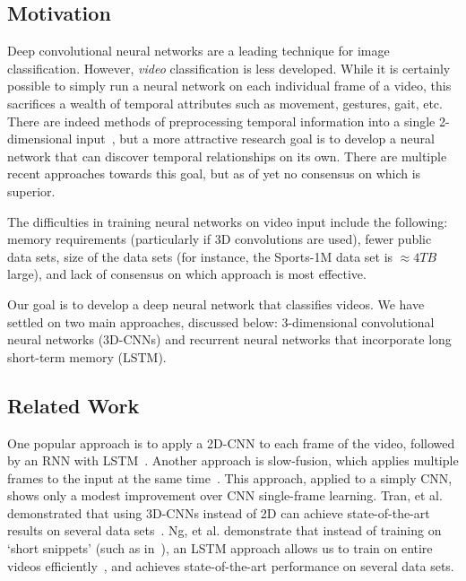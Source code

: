\subsection*{Motivation}
Deep convolutional neural networks are a leading technique for image classification.
However, \emph{video} classification is less developed.
While it is certainly possible to simply run a neural network on each individual frame of a video, this sacrifices a wealth of temporal attributes such as movement, gestures, gait, etc.
There are indeed methods of preprocessing temporal information into a single 2-dimensional input~\cite{brox}, but a more attractive research goal is to develop a neural network that can discover temporal relationships on its own.
There are multiple recent approaches towards this goal, but as of yet no consensus on which is superior.

The difficulties in training neural networks on video input include the following: memory requirements (particularly if 3D convolutions are used), fewer public data sets, size of the data sets (for instance, the Sports-1M data set is $\approx 4TB$ large), and lack of consensus on which approach is most effective. 

Our goal is to develop a deep neural network that classifies videos.
We have settled on two main approaches, discussed below: 3-dimensional convolutional neural networks (3D-CNNs) and recurrent neural networks that incorporate long short-term memory (LSTM).  

\subsection*{Related Work}

One popular approach is to apply a 2D-CNN to each frame of the video, followed by an RNN with LSTM~\cite{ltrcn}. 
Another approach is slow-fusion, which applies multiple frames to the input at the same time~\cite{cnnvid}. This approach, applied to a simply CNN, shows only a modest improvement over CNN single-frame learning.
Tran, et al. demonstrated that using 3D-CNNs instead of 2D can achieve state-of-the-art results on several data sets~\cite{stf}.
Ng, et al. demonstrate that instead of training on `short snippets' (such as in~\cite{cnnvid,stf}), an LSTM approach allows us to train on entire videos efficiently~\cite{snip}, and achieves state-of-the-art performance on several data sets.

